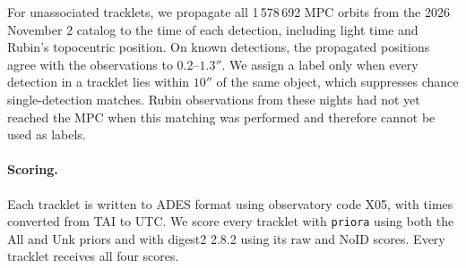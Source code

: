 \documentclass[linenumbers,twocolumn]{aastex701}
\newcommand{\priora}{{\tt priora}\xspace} %
\begin{document}
For unassociated tracklets, we propagate all 1\,578\,692 MPC orbits from the
2026 November 2 catalog to the time of each detection, including light time
and Rubin's topocentric position. On known detections, the propagated
positions agree with the observations to 0.2--$1.3''$. We assign a label only
when every detection in a tracklet lies within $10''$ of the same object,
which suppresses chance single-detection matches. Rubin observations from
these nights had not yet reached the MPC when this matching was performed and
therefore cannot be used as labels.


\paragraph{Scoring.}
Each tracklet is written to ADES format using observatory code X05, with
times converted from TAI to UTC. We score every tracklet with \priora using both
the All and Unk priors and with digest2 2.8.2 using its raw and NoID scores.
Every tracklet receives all four scores.


{}

\end{document}
